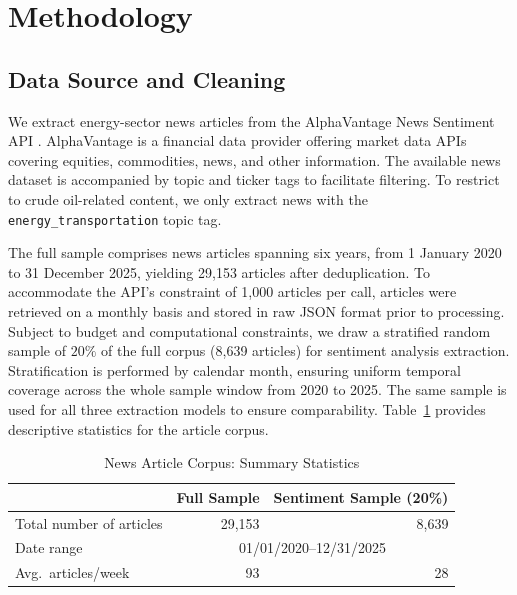 \documentclass[preprint,12pt,authoryear]{elsarticle}
\begin{document}
\section{Methodology}
\label{SecMethodlogy}


\subsection{Data Source and Cleaning}
\label{SubsecData}

We extract energy-sector news articles from the AlphaVantage News Sentiment
API \citep{alphavantage_api}. AlphaVantage is a financial data provider offering market data APIs covering equities, commodities, news, and other information. The available news dataset is accompanied by topic and ticker tags to facilitate filtering. To restrict to crude oil-related content, we only extract news with the \texttt{energy\_transportation} topic tag.

The full sample comprises news articles spanning six years, from 1 January 2020 to 31 December 2025, yielding  29,153  articles after deduplication. To accommodate the API's constraint of 1,000 articles per call, articles were retrieved on a monthly basis and stored in raw JSON format prior to processing. Subject to budget and  computational constraints, we draw a stratified random sample of $20\%$ of the full corpus (8,639 articles) for sentiment analysis extraction. Stratification is performed by calendar month, ensuring uniform temporal coverage across the whole sample window from 2020 to 2025. The same sample is used for all three extraction models to ensure comparability. Table~\ref{tab:data_summary} provides descriptive statistics for the
article corpus.

\FloatBarrier
\begin{table}[htbp]
\centering
\caption{News Article Corpus: Summary Statistics}
\label{tab:data_summary}
\begin{tabularx}{\textwidth}{Xrr}
\hline
 & Full Sample & Sentiment Sample (20\%) \\
\hline
Total number of articles          & 29{,}153  & 8{,}639 \\
Date range              & \multicolumn{2}{c}{01/01/2020--12/31/2025} \\
Avg.\ articles/week     & 93   & 28  \\
\hline
\end{tabularx}
\end{table}
\end{document}
